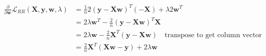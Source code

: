 \newcommand{\matrix}[1]{\mathbf{#1}}
\newcommand{\vector}[1]{\mathbf{#1}}
\newcommand{\X}{\matrix{X}}
\newcommand{\y}{\vector{y}}
\newcommand{\w}{\vector{w}}
\begin{align*}
\frac{\partial}{\partial \w} \mathcal{L}_{RR} (\X,\y,\w,\lambda) &= \frac{1}{n} 2(\y - \X\w)^T (-\X) + \lambda 2 \w^T \\
&= 2 \lambda \w^T - \frac{2}{n} (\y - \X\w)^T \X \\
&= 2 \lambda \w - \frac{2}{n} \X^T (\y - \X\w) \quad \text{transpose to get column vector} \\
&= \frac{2}{n} \X^T (\X\w - \y) + 2 \lambda \w \\
\end{align*}
